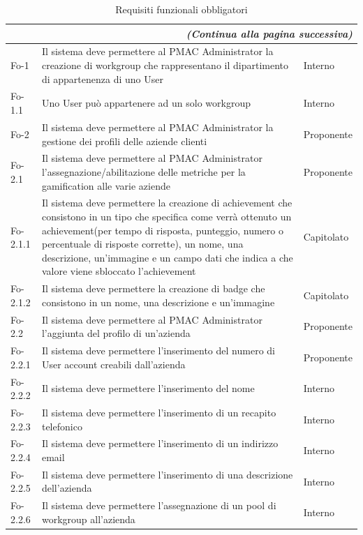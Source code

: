 \documentclass[10pt,a4paper]{article}
\begin{document}
\begin{longtable}{|p{}|p{}|p{}|}
\caption{Requisiti funzionali obbligatori}\\
\hline
\endfirsthead
\multicolumn{3}{r}{\textit{(Continua alla pagina successiva)}}
\endfoot
\multicolumn{3}{l}{\textit{(Continua dalla pagina precedente)}}
\endhead
\hline
\endlastfoot
\textbf{Codice}& \textbf{Descrizione}& \textbf{Fonte}\\
\hline
Fo-1 & Il sistema deve permettere al PMAC Administrator la creazione di workgroup che rappresentano il dipartimento di appartenenza di uno User & Interno\\
\hline
Fo-1.1 & Uno User può appartenere ad un solo workgroup & Interno\\
\hline
Fo-2 & Il sistema deve permettere al PMAC Administrator la gestione dei profili delle aziende clienti & Proponente\\
\hline
Fo-2.1 & Il sistema deve permettere al PMAC Administrator l'assegnazione/abilitazione delle metriche per la gamification alle varie aziende & Proponente\\
\hline
Fo-2.1.1 & Il sistema deve permettere la creazione di achievement che consistono in un tipo che specifica come verrà ottenuto un achievement(per tempo di risposta, punteggio, numero o percentuale di risposte corrette), un nome, una descrizione, un'immagine e un campo dati che indica a che valore viene sbloccato l'achievement & Capitolato\\
\hline
Fo-2.1.2 & Il sistema deve permettere la creazione di badge che consistono in un nome, una descrizione e un'immagine & Capitolato\\
\hline
Fo-2.2 & Il sistema deve permettere al PMAC Administrator l'aggiunta del profilo di un'azienda & Proponente\\
\hline
Fo-2.2.1 & Il sistema deve permettere l'inserimento del numero di User account creabili dall'azienda & Proponente\\
\hline
Fo-2.2.2 & Il sistema deve permettere l'inserimento del nome & Interno\\
\hline
Fo-2.2.3 & Il sistema deve permettere l'inserimento di un recapito telefonico & Interno\\
\hline
Fo-2.2.4 & Il sistema deve permettere l'inserimento di un indirizzo email & Interno\\
\hline
Fo-2.2.5 & Il sistema deve permettere l'inserimento di una descrizione dell'azienda & Interno\\
\hline
Fo-2.2.6 & Il sistema deve permettere l'assegnazione di un pool di workgroup all'azienda & Interno\\

\end{longtable}
\end{document}
